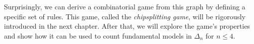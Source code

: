 Surprisingly, we can derive a combinatorial game from this graph by defining a specific set of rules. This game, called the \emph{chipsplitting game}, will be rigorously introduced in the next chapter. After that, we will explore the game's properties and show how it can be used to count fundamental models in $\Delta_n$ for $n \leq 4$.